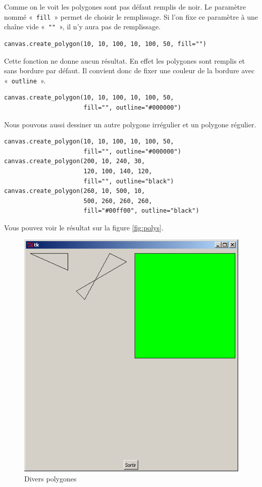 Comme on le voit les polygones sont pas défaut remplis de noir. Le paramètre nommé «~\texttt{fill}~» permet de choisir le remplissage. Si l'on fixe ce paramètre à une chaîne vide «~\texttt{""}~», il n'y aura pas de remplissage.

\begin{Verbatim}[frame=single,rulecolor=\color{mbleu}, label=à taper]
canvas.create_polygon(10, 10, 100, 10, 100, 50, fill="")
\end{Verbatim}

Cette fonction ne donne aucun résultat. En effet les polygones sont remplis et sans bordure par défaut. Il convient donc de fixer une couleur de la bordure avec «~\texttt{outline}~».

\begin{Verbatim}[frame=single,rulecolor=\color{mbleu}, label=à taper]
canvas.create_polygon(10, 10, 100, 10, 100, 50, 
                      fill="", outline="#000000")
\end{Verbatim}

Nous pouvons aussi dessiner un autre polygone irrégulier et un polygone régulier.

\begin{Verbatim}[frame=single,rulecolor=\color{mbleu}, label=à taper]
canvas.create_polygon(10, 10, 100, 10, 100, 50,
                      fill="", outline="#000000")
canvas.create_polygon(200, 10, 240, 30,
                      120, 100, 140, 120,
                      fill="", outline="black")
canvas.create_polygon(260, 10, 500, 10,
                      500, 260, 260, 260,
                      fill="#00ff00", outline="black")
\end{Verbatim}

Vous pouvez voir le résultat sur la figure \autoref{fig:polys}.
\begin{figure}[h!]
\centering
\includegraphics[scale=0.4]{images/polys}
\caption{Divers polygones}\label{fig:polys}
\end{figure}


